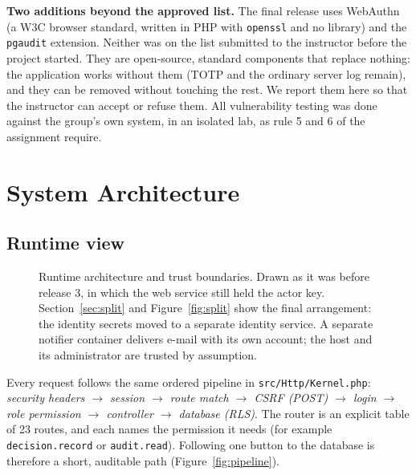 \documentclass[10pt,a4paper]{article}
\newcommand{\code}[1]{\nolinkurl{#1}}
\newcommand{\diagram}[3]{\begin{figure}[!htbp]\centering\adjustbox{max width=\linewidth,max height=6.6cm}{}\caption{#2}\label{fig:#3}\end{figure}}
\begin{document}
\textbf{Two additions beyond the approved list.} The final release uses WebAuthn (a W3C browser standard, written in PHP with \code{openssl} and no library) and the \code{pgaudit} extension. Neither was on the list submitted to the instructor before the project started. They are open-source, standard components that replace nothing: the application works without them (TOTP and the ordinary server log remain), and they can be removed without touching the rest. We report them here so that the instructor can accept or refuse them.
All vulnerability testing was done against the group's own system, in an isolated lab, as rule 5 and 6 of the assignment require.

\section{System Architecture}\label{sec:arch}

\subsection{Runtime view}
\diagram{arch}{Runtime architecture and trust boundaries. Drawn as it was before release 3, in which the web service still held the actor key. Section~\ref{sec:split} and Figure~\ref{fig:split} show the final arrangement: the identity secrets moved to a separate identity service. A separate notifier container delivers e-mail with its own account; the host and its administrator are trusted by assumption.}{arch}

Every request follows the same ordered pipeline in \code{src/Http/Kernel.php}: \emph{security headers $\rightarrow$ session $\rightarrow$ route match $\rightarrow$ CSRF (POST) $\rightarrow$ login $\rightarrow$ role permission $\rightarrow$ controller $\rightarrow$ database (RLS)}. The router is an explicit table of 23 routes, and each names the permission it needs (for example \code{decision.record} or \code{audit.read}). Following one button to the database is therefore a short, auditable path (Figure~\ref{fig:pipeline}).
\end{document}
